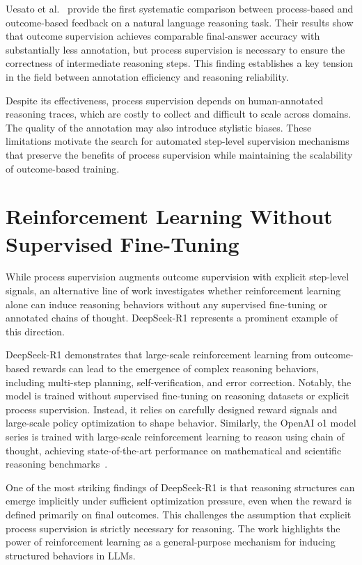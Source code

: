 \documentclass[12pt]{report}
\begin{document}
Uesato et al.~\cite{uesato2022solvingmathwordproblems} provide the first systematic comparison between process-based and outcome-based feedback on a natural language reasoning task. Their results show that outcome supervision achieves comparable final-answer accuracy with substantially less annotation, but process supervision is necessary to ensure the correctness of intermediate reasoning steps. This finding establishes a key tension in the field between annotation efficiency and reasoning reliability.

Despite its effectiveness, process supervision depends on human-annotated reasoning traces, which are costly to collect and difficult to scale across domains. The quality of the annotation may also introduce stylistic biases. These limitations motivate the search for automated step-level supervision mechanisms that preserve the benefits of process supervision while maintaining the scalability of outcome-based training.

\section{Reinforcement Learning Without Supervised Fine-Tuning}
While process supervision augments outcome supervision with explicit step-level signals, an alternative line of work investigates whether reinforcement learning alone can induce reasoning behaviors without any supervised fine-tuning or annotated chains of thought. DeepSeek-R1 represents a prominent example of this direction.

DeepSeek-R1 demonstrates that large-scale reinforcement learning from outcome-based rewards can lead to the emergence of complex reasoning behaviors, including multi-step planning, self-verification, and error correction\cite{Guo_2025}. Notably, the model is trained without supervised fine-tuning on reasoning datasets or explicit process supervision. Instead, it relies on carefully designed reward signals and large-scale policy optimization to shape behavior. Similarly, the OpenAI o1 model series is trained with large-scale reinforcement learning to reason using chain of thought, achieving state-of-the-art performance on mathematical and scientific reasoning benchmarks~\cite{openai2024openaio1card}.

One of the most striking findings of DeepSeek-R1 is that reasoning structures can emerge implicitly under sufficient optimization pressure, even when the reward is defined primarily on final outcomes. This challenges the assumption that explicit process supervision is strictly necessary for reasoning. The work highlights the power of reinforcement learning as a general-purpose mechanism for inducing structured behaviors in LLMs.
\end{document}
